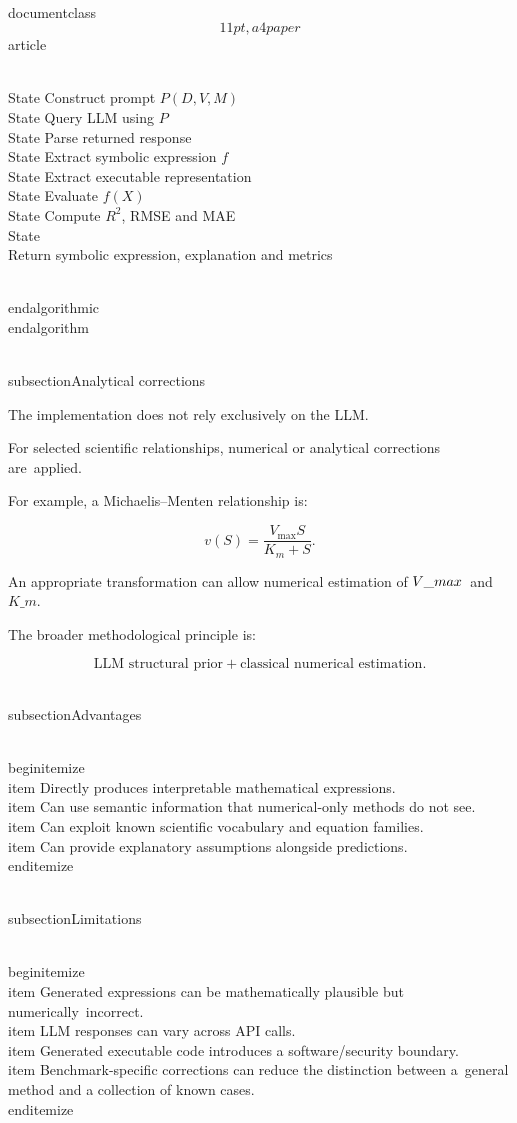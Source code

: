 \\documentclass\[11pt,a4paper\]{article}
\begin{document}
 \\State Construct prompt $P(D,V,M)$\
 \\State Query LLM using $P$\
 \\State Parse returned response\
 \\State Extract symbolic expression $f$\
 \\State Extract executable representation\
 \\State Evaluate $f(X)$\
 \\State Compute $R^2$, RMSE and MAE\
 \\State \\Return symbolic expression, explanation and metrics

 \\end{algorithmic}\
 \\end{algorithm}

 \\subsection{Analytical corrections}

 The implementation does not rely exclusively on the LLM.

 For selected scientific relationships, numerical or analytical corrections are\
 applied.

 For example, a Michaelis--Menten relationship is:

 $$
v(S)=\frac{V_{\max}S}{K_m+S}.
$$

 An appropriate transformation can allow numerical estimation of $V\_{\\max}$\
 and $K\_m$.

 The broader methodological principle is:

 $$
\text{LLM structural prior}
+
\text{classical numerical estimation}.
$$

 \\subsection{Advantages}

 \\begin{itemize}\
 \\item Directly produces interpretable mathematical expressions.\
 \\item Can use semantic information that numerical-only methods do not see.\
 \\item Can exploit known scientific vocabulary and equation families.\
 \\item Can provide explanatory assumptions alongside predictions.\
 \\end{itemize}

 \\subsection{Limitations}

 \\begin{itemize}\
 \\item Generated expressions can be mathematically plausible but numerically\
 incorrect.\
 \\item LLM responses can vary across API calls.\
 \\item Generated executable code introduces a software/security boundary.\
 \\item Benchmark-specific corrections can reduce the distinction between a\
 general method and a collection of known cases.\
 \\end{itemize}
\end{document}
